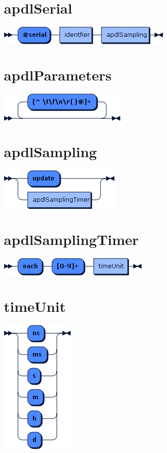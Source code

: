 \begin{appendices}
\section*{apdlSerial}\includegraphics[scale=0.7]{img/ebnf_grammar/apdlSerial}
\section*{apdlParameters}\includegraphics[scale=0.7]{img/ebnf_grammar/apdlParameters}
\section*{apdlSampling}\includegraphics[scale=0.7]{img/ebnf_grammar/apdlSampling}
\section*{apdlSamplingTimer}\includegraphics[scale=0.7]{img/ebnf_grammar/apdlSamplingTimer}
\section*{timeUnit}\includegraphics[scale=0.7]{img/ebnf_grammar/timeUnit}

\end{appendices}
